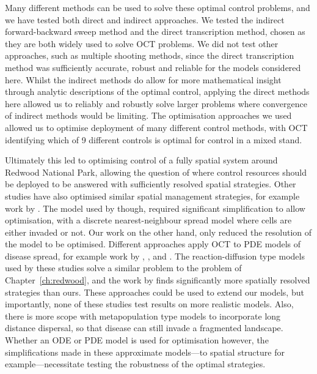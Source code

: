 Many different methods can be used to solve these optimal control problems, and we have tested both direct and indirect approaches. We tested the indirect forward-backward sweep method and the direct transcription method, chosen as they are both widely used to solve OCT problems. We did not test other approaches, such as multiple shooting methods, since the direct transcription method was sufficiently accurate, robust and reliable for the models considered here. Whilst the indirect methods do allow for more mathematical insight through analytic descriptions of the optimal control, applying the direct methods here allowed us to reliably and robustly solve larger problems where convergence of indirect methods would be limiting. The optimisation approaches we used allowed us to optimise deployment of many different control methods, with OCT identifying which of 9 different controls is optimal for control in a mixed stand.

Ultimately this led to optimising control of a fully spatial system around Redwood National Park, allowing the question of where control resources should be deployed to be answered with sufficiently resolved spatial strategies. Other studies have also optimised similar spatial management strategies, for example work by \citet{epanchin_optimal_2012}. The model used by \citet{epanchin_optimal_2012} though, required significant simplification to allow optimisation, with a discrete nearest-neighbour spread model where cells are either invaded or not. Our work on the other hand, only reduced the resolution of the model to be optimised. Different approaches apply OCT to PDE models of disease spread, for example work by \citet{neilan_optimal_2011}, \citet{christley_optimal_2016}, and \citet{miyaoka_optimal_2019}. The reaction-diffusion type models used by these studies solve a similar problem to the problem of Chapter~\ref{ch:redwood}, and the work by \citet{miyaoka_optimal_2019} finds significantly more spatially resolved strategies than ours. These approaches could be used to extend our models, but importantly, none of these studies test results on more realistic models. Also, there is more scope with metapopulation type models to incorporate long distance dispersal, so that disease can still invade a fragmented landscape. Whether an ODE or PDE model is used for optimisation however, the simplifications made in these approximate models---to spatial structure for example---necessitate testing the robustness of the optimal strategies.

